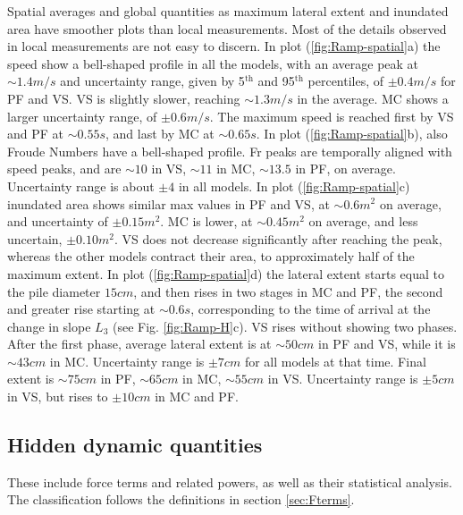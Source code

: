 \documentclass{article}
\begin{document}
Spatial averages and global quantities as maximum lateral extent and inundated area have smoother plots than local measurements. Most of the details observed in local measurements are not easy to discern. In plot (\ref{fig:Ramp-spatial}a) the speed show a bell-shaped profile in all the models, with an average peak at $\sim 1.4 m/s$ and uncertainty range, given by 5$^{\mathrm{th}}$ and 95$^{\mathrm{th}}$ percentiles, of $\pm 0.4 m/s$ for PF and VS. VS is slightly slower, reaching $\sim 1.3 m/s$ in the average. MC shows a larger uncertainty range, of $\pm 0.6 m/s$. The maximum speed is reached first by VS and PF at $\sim 0.55 s$, and last by MC at $\sim 0.65 s$. In plot (\ref{fig:Ramp-spatial}b), also Froude Numbers have a bell-shaped profile. Fr peaks are temporally aligned with speed peaks, and are $\sim 10$ in VS, $\sim 11$ in MC, $\sim 13.5$ in PF, on average. Uncertainty range is about $\pm 4$ in all models. In plot (\ref{fig:Ramp-spatial}c) inundated area shows similar max values in PF and VS, at $\sim 0.6 m^2$ on average, and uncertainty of $\pm 0.15 m^2$. MC is lower, at $\sim 0.45 m^2$ on average, and less uncertain, $\pm 0.10 m^2$. VS does not decrease significantly after reaching the peak, whereas the other models contract their area, to approximately half of the maximum extent. In plot (\ref{fig:Ramp-spatial}d) the lateral extent starts equal to the pile diameter $15 cm$, and then rises in two stages in MC and PF, the second and greater rise starting at $\sim 0.6 s$, corresponding to the time of arrival at the change in slope $L_3$ (see Fig. \ref{fig:Ramp-H}c). VS rises without showing two phases. After the first phase, average lateral extent is at $\sim 50 cm$ in PF and VS, while it is $\sim 43 cm$ in MC. Uncertainty range is $\pm 7 cm$ for all models at that time. Final extent is $\sim 75 cm$ in PF, $\sim 65 cm$ in MC, $\sim 55 cm$ in VS. Uncertainty range is $\pm 5 cm$ in VS, but rises to $\pm 10 cm$ in MC and PF.

\subsection{Hidden dynamic quantities}\label{Hq1}
These include force terms and related powers, as well as their statistical analysis. The classification follows the definitions in section \ref{sec:Fterms}.
\end{document}
